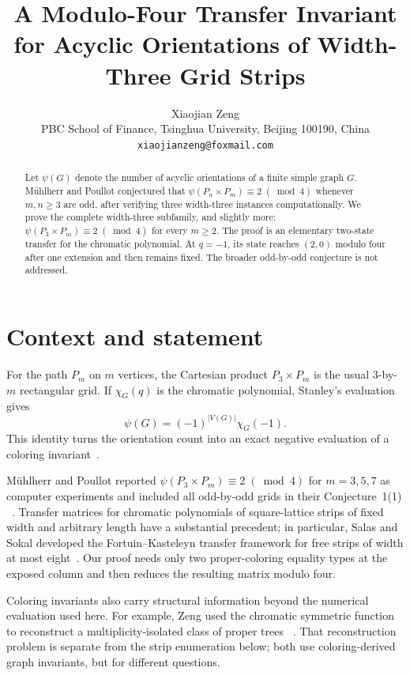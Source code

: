 \documentclass[11pt]{article}
\title{A Modulo-Four Transfer Invariant for Acyclic Orientations of Width-Three Grid Strips}
\author{Xiaojian Zeng\\
PBC School of Finance, Tsinghua University, Beijing 100190, China\\
\texttt{xiaojianzeng@foxmail.com}}
\date{}
\newcommand{\psia}{\psi}
\begin{document}
\maketitle

\begin{abstract}
Let $\psia(G)$ denote the number of acyclic orientations of a finite simple
graph $G$.  Mühlherr and Poullot conjectured that
$\psia(P_n\times P_m)\equiv2\;(\bmod 4)$ whenever $m,n\geq3$ are odd,
after verifying three width-three instances computationally.  We prove the
complete width-three subfamily, and slightly more:
$\psia(P_3\times P_m)\equiv2\;(\bmod 4)$ for every $m\geq2$.
The proof is an elementary two-state transfer for the chromatic polynomial.
At $q=-1$, its state reaches $(2,0)$ modulo four after one extension and then
remains fixed.  The broader odd-by-odd conjecture is not addressed.
\end{abstract}

\section{Context and statement}

For the path $P_m$ on $m$ vertices, the Cartesian product
$P_3\times P_m$ is the usual $3$-by-$m$ rectangular grid.  If
$\chi_G(q)$ is the chromatic polynomial, Stanley's evaluation gives
\begin{equation}\label{eq:stanley}
  \psia(G)=(-1)^{|V(G)|}\chi_G(-1).
\end{equation}
This identity turns the orientation count into an exact negative evaluation
of a coloring invariant~\cite{Stanley1973}.

Mühlherr and Poullot reported
$\psia(P_3\times P_m)\equiv2\;(\bmod 4)$ for $m=3,5,7$ as computer
experiments and included all odd-by-odd grids in their Conjecture~1(1)
~\cite[Example~3.13(8) and Conjecture~1(1)]{MuehlherrPoullot2026}.
Transfer matrices for chromatic polynomials of square-lattice strips of fixed
width and arbitrary length have a substantial precedent; in particular,
Salas and Sokal developed the Fortuin--Kasteleyn transfer framework for free
strips of width at most eight~\cite{SalasSokal2001}.  Our proof needs only two
proper-coloring equality types at the exposed column and then reduces the
resulting matrix modulo four.

Coloring invariants also carry structural information beyond the numerical
evaluation used here.  For example, Zeng used the chromatic symmetric function
to reconstruct a multiplicity-isolated class of proper trees
~\cite{Zeng2026MultiplicityArxiv}.  That reconstruction problem is separate
from the strip enumeration below; both use coloring-derived graph invariants,
but for different questions.
\end{document}
